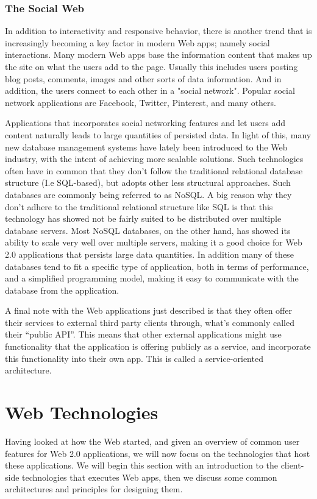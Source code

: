 \subsubsection{The Social Web}
In addition to interactivity and responsive behavior, there is another trend that is increasingly becoming a key factor in modern Web apps; namely social interactions. Many modern Web apps base the information content that makes up the site on what the users add to the page. Usually this includes users posting blog posts, comments, images and other sorts of data information. And in addition, the users connect to each other in a "social network". Popular social network applications are Facebook\cite{face}, Twitter\cite{twitter}, Pinterest\cite{pinterest}, and many others. 

Applications that incorporates social networking features and let users add content naturally leads to large quantities of persisted data. In light of this, many new database management systems have lately been introduced to the Web industry, with the intent of achieving more scalable solutions. Such technologies often have in common that they don't follow the traditional relational database structure (I.e SQL-based), but adopts other less structural approaches. Such databases are commonly being referred to as NoSQL\cite{nosql}. A big reason why they don't adhere to the traditional relational structure like SQL is that this technology has showed not be fairly suited to be distributed over multiple database servers\cite{cloudmanagement}. Most NoSQL databases, on the other hand, has showed its ability to scale very well over multiple servers, making it a good choice for Web 2.0 applications that persists large data quantities. In addition many of these databases tend to fit a specific type of application, both in terms of performance, and a simplified programming model, making it easy to communicate with the database from the application.

A final note with the Web applications just described is that they often offer their services to external third party clients through, what's commonly called their ``public API''. This means that other external applications might use functionality that the application is offering publicly as a service, and incorporate this functionality into their own app. This is called a service-oriented architecture\cite{soa}.

\section{Web Technologies}
Having looked at how the Web started, and given an overview of common user features for Web 2.0 applications, we will now focus on the technologies that host these applications. We will begin this section with an introduction to the client-side technologies that executes Web apps, then we discuss some common architectures and principles for designing them.


